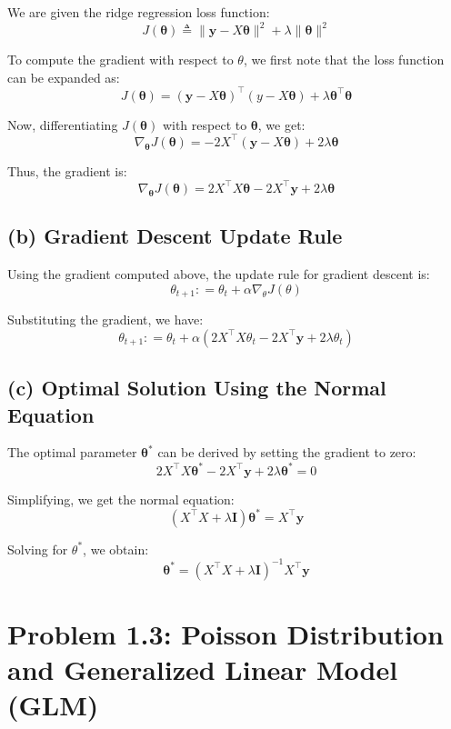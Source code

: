 \documentclass[12pt]{article}
\begin{document}
We are given the ridge regression loss function:
\[
    J(\boldsymbol\theta) \triangleq \| \boldsymbol y - X \boldsymbol\theta \|^2 + \lambda \|\boldsymbol\theta\|^2
\]

To compute the gradient with respect to \( \theta \), we first note that the loss function can be expanded as:
\[
    J(\boldsymbol\theta) = (\boldsymbol y - X\boldsymbol\theta)^\top (y - X\boldsymbol\theta) + \lambda \boldsymbol\theta^\top \boldsymbol\theta
\]

Now, differentiating \( J(\boldsymbol\theta) \) with respect to \( \boldsymbol\theta \), we get:
\[
    \nabla_{\boldsymbol\theta} J(\boldsymbol\theta) = -2X^\top(\boldsymbol y - X \boldsymbol\theta) + 2\lambda\boldsymbol\theta
\]

Thus, the gradient is:
\[
    \nabla_{\boldsymbol\theta} J(\boldsymbol\theta) = 2X^\top X \boldsymbol\theta - 2X^\top \boldsymbol y + 2\lambda \boldsymbol\theta
\]

\subsection*{(b) Gradient Descent Update Rule}

Using the gradient computed above, the update rule for gradient descent is:
\[
    \theta_{t+1} \colon= \theta_{t} + \alpha \nabla_\theta J(\theta)
\]

Substituting the gradient, we have:
\[
    \theta_{t+1} \colon= \theta_{t} + \alpha \left( 2X^\top X \theta_t - 2X^\top \boldsymbol y + 2\lambda \theta_t \right)
\]

\subsection*{(c) Optimal Solution Using the Normal Equation}

The optimal parameter \( \boldsymbol\theta^* \) can be derived by setting the gradient to zero:
\[
    2X^\top X \boldsymbol\theta^* - 2X^\top \boldsymbol y + 2\lambda \boldsymbol\theta^* = 0
\]

Simplifying, we get the normal equation:
\[
    (X^\top X +\lambda \boldsymbol I)\boldsymbol\theta^* = X^\top \boldsymbol y
\]

Solving for \( \theta^* \), we obtain:
\[
    \boldsymbol\theta^* = (X^\top X + \lambda \boldsymbol I)^{-1} X^\top \boldsymbol y
\]

\newpage

\section*{Problem 1.3: Poisson Distribution and Generalized Linear Model (GLM)}
\end{document}
